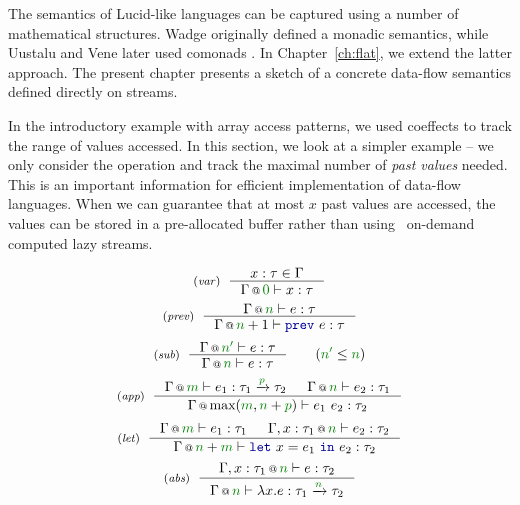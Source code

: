 The semantics of Lucid-like languages can be captured using a number of mathematical 
structures. Wadge \cite{app-lucid-monads} originally defined a monadic semantics, while Uustalu 
and Vene later used comonads \cite{app-dataflow-essence}. In Chapter~\ref{ch:flat}, we extend
the latter approach. The present chapter presents a sketch of a concrete data-flow semantics
defined directly on streams.

In the introductory example with array access patterns, we used coeffects to track the range
of values accessed. In this section, we look at a simpler example -- we only consider the
 operation and track the maximal number of \emph{past values} needed. This is an 
important information for efficient implementation of data-flow languages. When we can guarantee
that at most $x$ past values are accessed, the values can be stored in a pre-allocated buffer
rather than using \eg~on-demand computed lazy streams.


\begin{figure}[t]
\begin{equation*}
\tyrule{var}
  {x : \tau \in \Gamma}
  {\coctx{\Gamma}{\cclrd{ 0 }} \vdash x : \tau }
\end{equation*}
\begin{equation*}
\tyrule{prev}
  {\coctx{\Gamma}{ \cclrd{n} } \vdash e : \tau}
  {\coctx{\Gamma}{ \cclrd{n}+1} \vdash \kvd{prev}~e : \tau}
\end{equation*}
\begin{equation*}
\tyrule{sub}
  {\coctx{\Gamma}{\cclrd{n'}} \vdash e : \tau }
  {\coctx{\Gamma}{\cclrd{n}} \vdash e : \tau }\quad\quad(\cclrd{n'} \leq \cclrd{n})
\end{equation*}
\begin{equation*}
\tyrule{app}
  {\coctx{\Gamma}{\cclrd{m}} \vdash e_1 : \tau_1 \xrightarrow{\cclrd{p}} \tau_2 &
   \coctx{\Gamma}{\cclrd{n}} \vdash e_2 : \tau_1 }
  {\coctx{\Gamma}{\textnormal{max}(\cclrd{m}, \cclrd{n} + \cclrd{p})} \vdash e_1~e_2 : \tau_2}
\end{equation*}
\begin{equation*}
\tyrule{let}
  { \coctx{\Gamma}{\cclrd{m}} \vdash e_1 : \tau_1 &
    \coctx{\Gamma, x:\tau_1}{\cclrd{n}} \vdash e_2 : \tau_2}
  {\coctx{\Gamma}{\cclrd{n}+\cclrd{m}} \vdash \kvd{let}~x=e_1~\kvd{in}~e_2 : \tau_2 }
\end{equation*}
\begin{equation*}
\tyrule{abs}
  {\coctx{\Gamma, x:\tau_1}{\cclrd{n}} \vdash e : \tau_2}
  {\coctx{\Gamma}{\cclrd{n}} \vdash \lambda x.e : \tau_1 \xrightarrow{\cclrd{n}} \tau_2 }
\end{equation*}

\label{fig:applications-flat-dataflow}
\end{figure}

